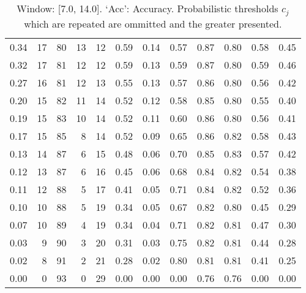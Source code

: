 \begin{table}[ht]
\begin{tabular}{r|rrrrrrrrrrr}
  0.34 & 17 & 80 & 13 & 12 & 0.59 & 0.14 & 0.57 & 0.87 & 0.80 & 0.58 & 0.45 \\ 
  0.32 & 17 & 81 & 12 & 12 & 0.59 & 0.13 & 0.59 & 0.87 & 0.80 & 0.59 & 0.46 \\ 
  0.27 & 16 & 81 & 12 & 13 & 0.55 & 0.13 & 0.57 & 0.86 & 0.80 & 0.56 & 0.42 \\ 
  0.20 & 15 & 82 & 11 & 14 & 0.52 & 0.12 & 0.58 & 0.85 & 0.80 & 0.55 & 0.40 \\ 
  0.19 & 15 & 83 & 10 & 14 & 0.52 & 0.11 & 0.60 & 0.86 & 0.80 & 0.56 & 0.41 \\ 
  0.17 & 15 & 85 & 8 & 14 & 0.52 & 0.09 & 0.65 & 0.86 & 0.82 & 0.58 & 0.43 \\ 
  0.13 & 14 & 87 & 6 & 15 & 0.48 & 0.06 & 0.70 & 0.85 & 0.83 & 0.57 & 0.42 \\ 
  0.12 & 13 & 87 & 6 & 16 & 0.45 & 0.06 & 0.68 & 0.84 & 0.82 & 0.54 & 0.38 \\ 
  0.11 & 12 & 88 & 5 & 17 & 0.41 & 0.05 & 0.71 & 0.84 & 0.82 & 0.52 & 0.36 \\ 
  0.10 & 10 & 88 & 5 & 19 & 0.34 & 0.05 & 0.67 & 0.82 & 0.80 & 0.45 & 0.29 \\ 
  0.07 & 10 & 89 & 4 & 19 & 0.34 & 0.04 & 0.71 & 0.82 & 0.81 & 0.47 & 0.30 \\ 
  0.03 & 9 & 90 & 3 & 20 & 0.31 & 0.03 & 0.75 & 0.82 & 0.81 & 0.44 & 0.28 \\ 
  0.02 & 8 & 91 & 2 & 21 & 0.28 & 0.02 & 0.80 & 0.81 & 0.81 & 0.41 & 0.25 \\ 
  0.00 & 0 & 93 & 0 & 29 & 0.00 & 0.00 & 0.00 & 0.76 & 0.76 & 0.00 & 0.00 \\ 
   \hline
\end{tabular}
\endgroup
\caption{Window: [7.0, 14.0]. `Acc': Accuracy. Probabilistic thresholds $c_j$ which are repeated are ommitted and the greater presented.}
\label{tab:appendix-PBC-ROCs-w3}
\end{table}



\resettocappx